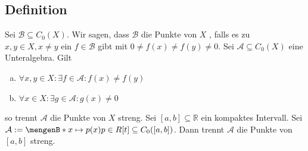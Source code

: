 \subsection[Definition: $\mathcal{B} \subseteq C_0(X)$ trennt $x,y \in X$ streng]{Definition} %
\label{sub:62}
Sei $\mathcal{B} \subseteq C_0(X) $. Wir sagen, dass $\mathcal{B}$ die Punkte von $X$ , falls es zu $x,y \in X, x \not= y$ ein $f \in \mathcal{B}$ gibt 
mit $0 \not= f(x) \not= f(y)  \not= 0$.
Sei $\mathcal{A} \subseteq C_0(X) $ eine Unteralgebra. Gilt
\begin{enumerate}[a)]
	\item $\forall x,y \in X : \exists f \in \mathcal{A}  : f(x) \not= f(y)$
	\item $\forall x \in X : \exists g \in \mathcal{A} : g(x) \not= 0 $
\end{enumerate}
so trennt $\mathcal{A}$ die Punkte von $X$ streng.
Sei $[a,b] \subseteq \mathds{R}$ ein kompaktes Intervall. Sei $\mathcal{A} := \set[x \mapsto p(x)]{p \in R[t]} \subseteq C_0([a,b])$. Dann trennt $\mathcal{A}$ die Punkte 
von $[a,b]$ streng.

